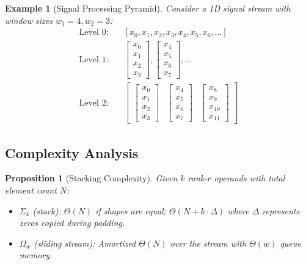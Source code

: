 \documentclass[11pt]{article}
\newtheorem{proposition}[theorem]{Proposition}
\newtheorem{example}[theorem]{Example}
\begin{document}
\begin{example}[Signal Processing Pyramid]
Consider a 1D signal stream with window sizes $w_1 = 4, w_2 = 3$:
\begin{align}
\text{Level 0:} &\quad [x_0, x_1, x_2, x_3, x_4, x_5, x_6, \ldots] \\
\text{Level 1:} &\quad \begin{bmatrix} x_0 \\ x_1 \\ x_2 \\ x_3 \end{bmatrix}, \begin{bmatrix} x_4 \\ x_5 \\ x_6 \\ x_7 \end{bmatrix}, \ldots \\
\text{Level 2:} &\quad \begin{bmatrix} \begin{bmatrix} x_0 \\ x_1 \\ x_2 \\ x_3 \end{bmatrix} & \begin{bmatrix} x_4 \\ x_5 \\ x_6 \\ x_7 \end{bmatrix} & \begin{bmatrix} x_8 \\ x_9 \\ x_{10} \\ x_{11} \end{bmatrix} \end{bmatrix}
\end{align}
\end{example}

\subsection{Complexity Analysis}

\begin{proposition}[Stacking Complexity]
Given $k$ rank-$r$ operands with total element count $N$:
\begin{itemize}
\item $\Sigma_k$ (stack): $\Theta(N)$ if shapes are equal; $\Theta(N + k \cdot \Delta)$ where $\Delta$ represents zeros copied during padding.
\item $\Omega_w$ (sliding stream): Amortized $\Theta(N)$ over the stream with $\Theta(w)$ queue memory.
\end{itemize}
\end{proposition}
\end{document}
